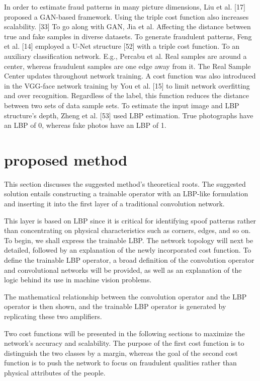 \documentclass[journal]{IEEEtran}
\begin{document}
In order to estimate fraud patterns in many picture dimensions, Liu et al. [17] proposed a GAN-based framework.
Using the triple cost function also increases scalability. [33]
To go along with GAN, Jia et al. Affecting the distance between true and fake samples in diverse datasets.
To generate fraudulent patterns, Feng et al. [14] employed a U-Net structure [52] with a triple cost function. To an auxiliary classification network.
E.g., Percabu et al.
Real samples are around a center, whereas fraudulent samples are one edge away from it. The Real Sample Center updates throughout network training.
A cost function was also introduced in the VGG-face network training by You et al. [15] to limit network overfitting and over recognition. Regardless of the label, this function reduces the distance between two sets of data sample sets.
To estimate the input image and LBP structure's depth, Zheng et al. [53] used LBP estimation. True photographs have an LBP of 0, whereas fake photos have an LBP of 1.

\section{proposed method}
This section discusses the suggested method's theoretical roots. The suggested solution entails constructing a trainable operator with an LBP-like formulation and inserting it into the first layer of a traditional convolution network.

This layer is based on LBP since it is critical for identifying spoof patterns rather than concentrating on physical characteristics such as corners, edges, and so on.
To begin, we shall express the trainable LBP. The network topology will next be detailed, followed by an explanation of the newly incorporated cost function. To define the trainable LBP operator, a broad definition of the convolution operator and convolutional networks will be provided, as well as an explanation of the logic behind its use in machine vision problems.

The mathematical relationship between the convolution operator and the LBP operator is then shown, and the trainable LBP operator is generated by replicating these two amplifiers.

Two cost functions will be presented in the following sections to maximize the network's accuracy and scalability. The purpose of the first cost function is to distinguish the two classes by a margin, whereas the goal of the second cost function is to push the network to focus on fraudulent qualities rather than physical attributes of the people.
\end{document}
